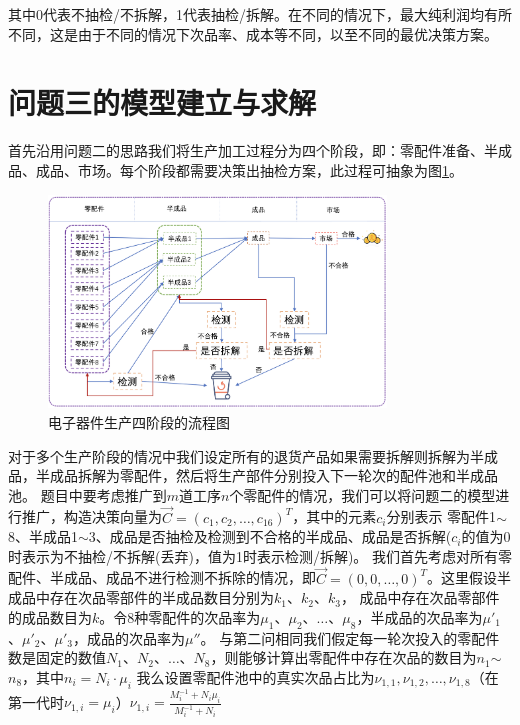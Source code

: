 \documentclass[withoutpreface,bwprint]{cumcmthesis} %
\begin{document}
其中0代表不抽检/不拆解，1代表抽检/拆解。在不同的情况下，最大纯利润均有所不同，这是由于不同的情况下次品率、成本等不同，以至不同的最优决策方案。






\section{问题三的模型建立与求解}
首先沿用问题二的思路我们将生产加工过程分为四个阶段，即：零配件准备、半成品、成品、市场。每个阶段都需要决策出抽检方案，此过程可抽象为图\ref{fig:pro3-1}。
\begin{figure}[H]
	\centering
	\includegraphics[width=0.8\textwidth]{Fig/pro3-1.png}
	\caption{电子器件生产四阶段的流程图}
	\label{fig:pro3-1}
\end{figure}
对于多个生产阶段的情况中我们设定所有的退货产品如果需要拆解则拆解为半成品，半成品拆解为零配件，然后将生产部件分别投入下一轮次的配件池和半成品池。
题目中要考虑推广到$m$道工序$n$个零配件的情况，我们可以将问题二的模型进行推广，构造决策向量为$\vec{C}=(c_{1},c_{2},\dots,c_{16})^{T}$，其中的元素$c_i$分别表示
零配件1$\sim$8、半成品1$\sim$3、成品是否抽检及检测到不合格的半成品、成品是否拆解($c_{i}$的值为0时表示为不抽检/不拆解(丢弃)，值为1时表示检测/拆解)。
我们首先考虑对所有零配件、半成品、成品不进行检测不拆除的情况，即$\vec{C}=(0,0,\dots,0)^{T}$。这里假设半成品中存在次品零部件的半成品数目分别为$k_{1}$、$k_{2}$、$k_{3}$，
成品中存在次品零部件的成品数目为$k$。令8种零配件的次品率为$\mu_{1}$、$\mu_{2}$、$\dots$、$\mu_{8}$，半成品的次品率为$\mu'_{1}$、$\mu'_{2}$、$\mu'_{3}$，成品的次品率为$\mu''$。
与第二问相同我们假定每一轮次投入的零配件数是固定的数值$N_{1}$、$N_{2}$、$\dots$、$N_{8}$，则能够计算出零配件中存在次品的数目为$n_{1}$$\sim$$n_{8}$，其中$n_{i}=N_{i}\cdot\mu_{i}$
		我么设置零配件池中的真实次品占比为$\nu_{1,1},\nu_{1,2},\dots,\nu_{1,8}$（在第一代时$\nu_{1,i}=\mu_{i}$）$\nu_{1,i}=\frac{M_{i}^{-1}+N_{i}\mu_{i}}{M_{i}^{-1}+N_{i}}$
\end{document}
